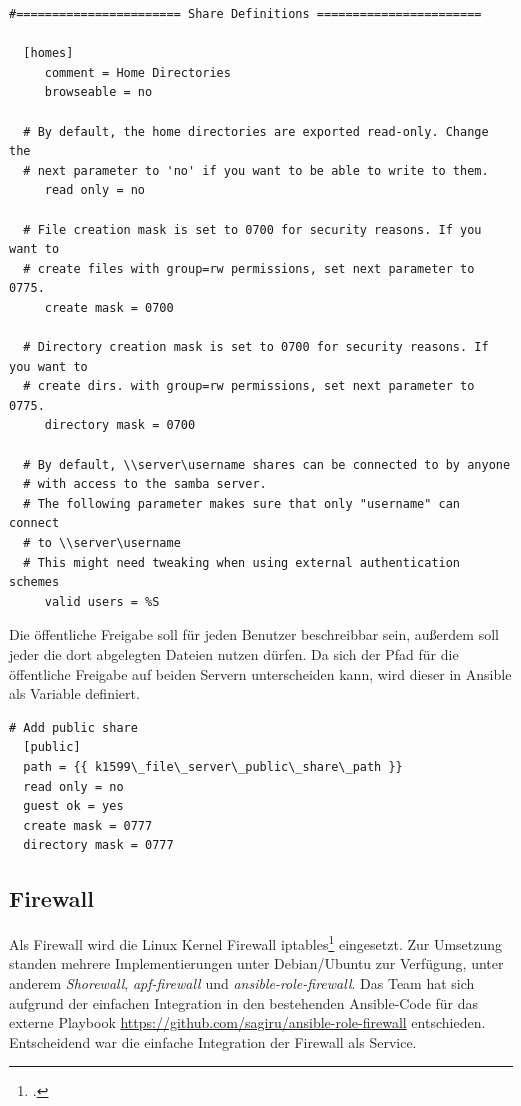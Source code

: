 \begin{lstlisting}[label=code:smbconf5,caption=Auszug aus /etc/samba/smb.conf]
  #======================= Share Definitions =======================
  
  [homes]
     comment = Home Directories
     browseable = no
  
  # By default, the home directories are exported read-only. Change the
  # next parameter to 'no' if you want to be able to write to them.
     read only = no
  
  # File creation mask is set to 0700 for security reasons. If you want to
  # create files with group=rw permissions, set next parameter to 0775.
     create mask = 0700
  
  # Directory creation mask is set to 0700 for security reasons. If you want to
  # create dirs. with group=rw permissions, set next parameter to 0775.
     directory mask = 0700
  
  # By default, \\server\username shares can be connected to by anyone
  # with access to the samba server.
  # The following parameter makes sure that only "username" can connect
  # to \\server\username
  # This might need tweaking when using external authentication schemes
     valid users = %S
\end{lstlisting}

Die öffentliche Freigabe soll für jeden Benutzer beschreibbar sein, außerdem soll jeder die dort abgelegten Dateien nutzen dürfen. Da sich der Pfad für die öffentliche Freigabe auf beiden Servern unterscheiden kann, wird dieser in Ansible als Variable definiert.

\begin{lstlisting}[label=code:smbconf5,caption=Auszug aus /etc/samba/smb.conf]
  # Add public share
  [public]
  path = {{ k1599\_file\_server\_public\_share\_path }}
  read only = no
  guest ok = yes
  create mask = 0777
  directory mask = 0777
\end{lstlisting}
  
\subsection{Firewall}
Als Firewall wird die Linux Kernel Firewall iptables\footcite{iptables} eingesetzt. Zur Umsetzung standen mehrere Implementierungen unter Debian/Ubuntu zur Verfügung, unter anderem \emph{Shorewall}, \emph{apf-firewall} und \emph{ansible-role-firewall}. Das Team hat sich aufgrund der einfachen Integration in den bestehenden Ansible-Code für das externe Playbook \url{https://github.com/sagiru/ansible-role-firewall} entschieden. Entscheidend war die einfache Integration der Firewall als Service. \\

